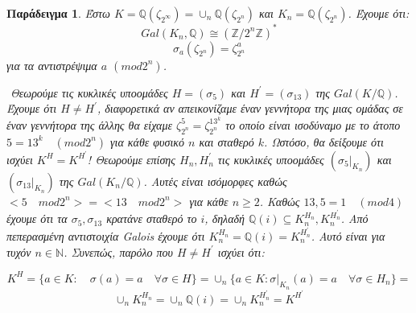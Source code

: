 \documentclass[oneside,a4paper]{article}
\newtheorem{example}{Παράδειγμα}
\newcommand {\tl}{\textlatin}
\newcommand{\Z}{\mathbb{Z}}
\newcommand{\Q}{\mathbb{Q}}
\begin{document}
\begin{example}
	Έστω $K = \mathbb{Q}(\zeta_{2^{\infty}}) = \cup_n \mathbb{Q} (\zeta_{2^n})$ και $K_n = \mathbb{Q}(\zeta_{2^n})$. Έχουμε ότι: 
	$$Gal(K_n,\Q ) \cong (\Z / 2^n \Z )^*$$
	$$\sigma_a (\zeta_{2^n}) = \zeta^a_{2^n}$$
	για τα αντιστρέψιμα $a$  $(mod2^n)$.

	$ $\newline %
	\noindent Θεωρούμε τις κυκλικές υποομάδες $H = (\sigma_5)$ και $H^{\prime} = (\sigma_{13})$ της $Gal(K/ \Q)$. Έχουμε ότι $H \neq H^{\prime}$, διαφορετικά αν απεικονίζαμε έναν γεννήτορα της μιας ομάδας σε έναν γεννήτορα της άλλης θα είχαμε $\zeta^5_{2^n} = \zeta^{13^k}_{2^n}$ το οποίο είναι ισοδύναμο με το άτοπο $5 = 13^k \quad (mod2^n)$ για κάθε φυσικό $n$ και σταθερό $k$.
	Ωστόσο, θα δείξουμε ότι ισχύει $K^H = K^{H^{\prime}}$! Θεωρούμε επίσης $H_n, H^{\prime}_n$ τις κυκλικές υποομάδες $(\sigma_5|_{K_n} )$ και $(\sigma_{13}|_{K_n})$ της $Gal(K_n / \Q)$. Αυτές είναι ισόμορφες καθώς $<5 \quad mod2^n> = < 13 \quad mod2^n>$ για κάθε $n\geq 2$. Καθώς $13,5 = 1\quad (mod4)$ έχουμε ότι τα $\sigma_5, \sigma_{13}$ κρατάνε σταθερό το $i$, δηλαδή $\Q (i) \subseteq K^{H_n}_n , K^{H^{\prime}_n}_n $. Από πεπερασμένη αντιστοιχία \tl{Galois} έχουμε ότι $K^{H_n}_n = \Q (i) = K^{H^{\prime}_n}_n$. Αυτό είναι για τυχόν $n \in \mathbb N$. Συνεπώς,  παρόλο που $H \neq H^{\prime}$ ισχύει ότι:
	
		$$K^H = \{a \in K : \quad \sigma (a) = a \quad\forall \sigma \in H\} = \cup_n \{a\in K: \sigma|_{K_n} (a) = a \quad\forall \sigma \in H_n\} = $$
		$$\cup_n K^{H_n}_n = \cup_n \Q (i) = \cup_n K^{H^{\prime}_n}_n = K^{H^{\prime}}$$
\end{example}
\end{document}
